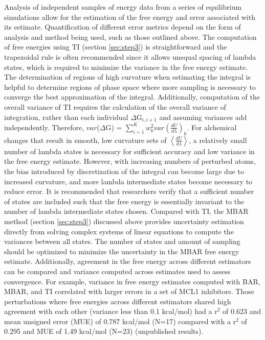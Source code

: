 \documentclass[9pt,bestpractices]{livecoms}
\newcommand{\expect}[1]{\left\langle{#1}\right\rangle}
\begin{document}
Analysis of independent samples of energy data from a series of equilibrium simulations allow for the estimation of the free energy and error associated with its estimate. 
Quantification of different error metrics depend on the form of analysis and method being used, such as those outlined above.
The computation of free energies using TI (section \ref{sec:step3}) is straightforward and the trapezoidal rule is often recommended since it allows unequal spacing of lambda states, which is required to minimize the variance in the free energy estimate. 
The determination of regions of high curvature when estimating the integral is helpful to determine regions of phase space where more sampling is necessary to converge the best approximation of the integral.
Additionally, computation of the overall variance of TI requires the calculation of the overall variance of integration, rather than each individual $\Delta$G$_{i,i+1}$ and assuming variances add independently. 
Therefore, $var$($\Delta$G) = $\sum_{i=1}^{K}w_{k}^2 var(\frac{dU}{d\lambda})_{k}$.
For alchemical changes that result in smooth, low curvature sets of $\expect{\frac{dU}{d\lambda}}$, a relatively small number of lambda states is necessary for sufficient accuracy and low variance in the free energy estimate. 
However, with increasing numbers of perturbed atoms, the bias introduced by discretization of the integral can become large due to increased curvature, and more lambda intermediate states become necessary to reduce error. 
It is recommended that researchers verify that a sufficient number of states are included such that the free energy is essentially invariant to the number of lambda intermediate states chosen.
Compared with TI, the MBAR method (section \ref{sec:step3}) discussed above provides uncertainty estimation directly from solving complex systems of linear equations to compute the variances between all states. 
The number of states and amount of sampling should be optimized to minimize the uncertainty in the MBAR free energy estimate. 
Additionally, agreement in the free energy across different estimators can be compared and variance computed across estimates used to assess convergence.
For example, variance in free energy estimates computed with BAR, MBAR, and TI correlated with larger errors in a set of MCL1 inhibitors.
Those perturbations where free energies across different estimators shared high agreement with each other (variance less than 0.1 kcal/mol) had a r$^2$ of 0.623 and mean unsigned error (MUE) of 0.787 kcal/mol (N=17) compared with a r$^2$ of 0.295 and MUE of 1.49 kcal/mol (N=23) (unpublished results).
\end{document}
